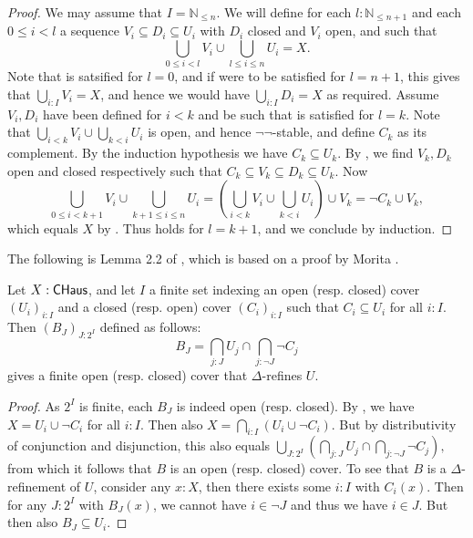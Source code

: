 \begin{proof}
  We may assume that $I = \mathbb N_{\leq n}$. We will define for each $l:\mathbb N_{\leq n+1}$ and each $0\leq i < l$ a sequence $V_i \subseteq D_i \subseteq U_i$ with $D_i$ closed and $V_i$ open, and such that
  \begin{equation}\label{inductionLoop}\bigcup_{0 \leq i < l} V_i \cup \bigcup_{l\leq  i\leq n} U_i = X.\end{equation}
  Note that  is satsified for $l=0$, and if were to be satisfied for $l=n+1$, this gives that $\bigcup_{i:I} V_i = X$, and hence we would have $\bigcup_{i:I} D_i = X$ as required. 
%
  Assume $V_i,D_i$ have been defined for $i<k$ and be such that  is satisfied for $l=k$. 
  Note that $\bigcup_{i<k} V_i \cup \bigcup_{k<i} U_i$ is open, and hence $\neg\neg$-stable, and define $C_k$ as its complement. By the induction hypothesis we have $C_k \subseteq U_k$. By , we find $V_k,D_k$ open and closed respectively such that 
  $C_k \subseteq V_k \subseteq D_k \subseteq U_k$. 
  Now
  $$
  \bigcup_{0\leq i< k+1} V_i \cup \bigcup_{k+1\leq i \leq n} U_i = 
  (\bigcup_{i<k}V_i \cup 
  \bigcup_{k<i} U_i)
  \cup V_k 
  = 
  \neg C_k \cup V_k,
  $$
  which equals $X$ by . 
  Thus  holds for $l=k+1$, and we conclude by induction. 
\end{proof}

The following is Lemma 2.2 of \cite{Howes}, which is based on a proof by Morita \cite{MoritaStar}. 
\begin{lemma}\label{Morita}
  Let $X:\mathsf{CHaus}$, and let $I$ a finite set indexing an open (resp. closed) cover $(U_i)_{i:I}$ and a closed (resp. open) cover $(C_i)_{i:I}$ such that $C_i \subseteq U_i$ for all $i:I$. 
  Then $(B_J)_{J:2^I}$ defined as follows:
  $$B_J = \bigcap_{j:J} U_j \cap \bigcap_{j:\neg J} \neg C_j$$
  gives a finite open (resp. closed) cover that $\Delta$-refines $U$. 
\end{lemma}
\begin{proof}
  As $2^I$ is finite, each $B_J$ is indeed open (resp. closed). 
  By , we have $X = U_i \cup \neg C_i$ for all $i:I$. Then also
  $X = \bigcap_{i:I} (U_i \cup \neg C_i)$. 
  But by distributivity of conjunction and disjunction, this also equals
  $
  \bigcup_{J:2^I} \left(\bigcap_{j:J} U_j \cap \bigcap_{j:\neg J} \neg C_j\right),
  $
  from which it follows that $B$ is an open (resp. closed) cover.
  To see that $B$ is a $\Delta$-refinement of $U$, consider any $x:X$, then there exists some $i:I$ with $C_i(x)$. 
  Then for any $J:2^I$ with $B_J(x)$, we cannot have $i \in \neg J$ and thus we have $i\in J$. But then also $B_J\subseteq U_i$.
\end{proof}

